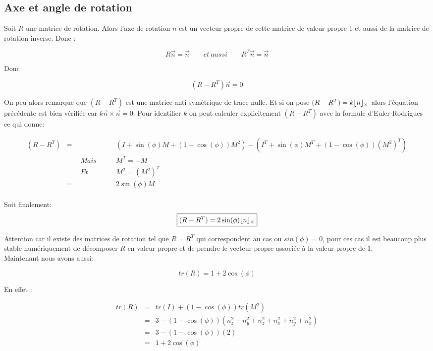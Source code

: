 \documentclass[12pt,a4paper]{article}
\DeclarePairedDelimiter\floor{\lfloor}{\rfloor}
\begin{document}
	\newpage
	\subsection{Axe et angle de rotation}
	
Soit $R$ une matrice de rotation. Alors l'axe de rotation $n$ est un vecteur propre de cette matrice de valeur propre 1 et aussi de la matrice de rotation inverse. Donc :

\[
R\vec{n}=\vec{n} \qquad et\ aussi \qquad R^T\vec{n}=\vec{n}
\]  

Donc 

\[
\boxed{(R-R^T)\vec{n}=0}
\]

On peu alors remarque que $(R-R^T)$ est une matrice anti-symétrique de trace nulle. Et si on pose 
$(R-R^T)=k \floor{n}_{\times}$ alors l'équation précédente est bien vérifiée car $k \vec{n}\times \vec{n}=0$. Pour identifier $k$ on peut calculer explicitement $(R-R^T)$ avec la formule d'Euler-Rodrigues ce qui donne:

\begin{eqnarray*}
	(R-R^T)&=& (I +\sin(\phi) M+(1-\cos(\phi))M^2)-(I^T +\sin(\phi) M^T+(1-\cos(\phi))(M^2)^T)\\
	&\qquad Mais\qquad& M^T=-M\\
	&\qquad Et \qquad& M^2=(M^2)^T\\
	&=& 2 \sin(\phi) M\\
\end{eqnarray*}

Soit finalement:
\[
\boxed{(R-R^T)=2 \sin(\phi)\floor{n}_{\times}}
\]

Attention car il existe des matrices de rotation tel que $R=R^T$ qui correspondent au cas ou $sin(\phi)=0$, pour ces cas il est beaucoup plus stable numériquement de décomposer $R$ en valeur propre et de prendre le vecteur propre associée à la valeur propre de 1.\\

Maintenant nous avons aussi:

\[
	\boxed{tr(R)=1+2 \cos(\phi)}
\]

En effet :

\begin{eqnarray*}
tr(R)&=&tr(I)+(1-\cos(\phi)) tr(M^2)\\
&=&3-(1-\cos(\phi))(n_z^2+n_y^2+n_z^2+n_x^2+n_y^2+n_x^2)\\
&=&3-(1-\cos(\phi))(2)\\
&=&1+2 \cos(\phi)\\
\end{eqnarray*}
	
\end{document}
